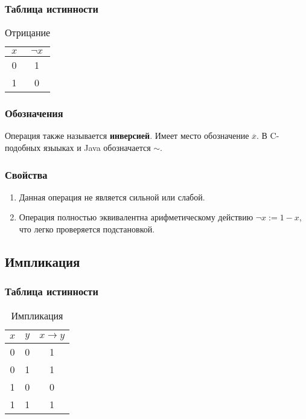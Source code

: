 \subsubsection{Таблица истинности}
\begin{table}[h]
	\begin{center}
		\begin{tabular}{|c|c|}
			\hline
			$x$ & $\neg x$\\
			\hline
			0 & 1\\
			\hline
			1 & 0\\
			\hline
		\end{tabular}
		\caption{Отрицание}
	\end{center}
\end{table}

\subsubsection{Обозначения}
Операция также называется \textbf{инверсией}. Имеет место обозначение $\overline{x}$. В C-подобных языыках и Java обозначается $\sim$.

\subsubsection{Свойства}
\begin{enumerate}
	\item Данная операция не является сильной или слабой.
	\item Операция полностью эквивалентна арифметическому действию $\neg{x} := 1 - x$, что легко проверяется подстановкой.
\end{enumerate}


\subsection{Импликация}
\subsubsection{Таблица истинности}
\begin{table}[h]
	\begin{center}
		\begin{tabular}{|c|c|c|}
			\hline
			$x$ & $y$ & $x\rightarrow y$\\
			\hline
			0 & 0 & 1\\
			\hline
			0 & 1 & 1\\
			\hline
			1 & 0 & 0\\
			\hline
			1 & 1 & 1\\
			\hline
		\end{tabular}
		\caption{Импликация}
	\end{center}
\end{table}

